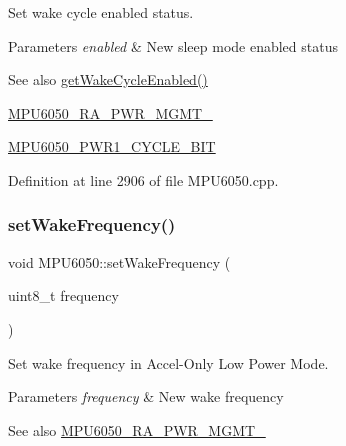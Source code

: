 Set wake cycle enabled status. 
\begin{DoxyParams}{Parameters}
{\em enabled} & New sleep mode enabled status \\
\hline
\end{DoxyParams}
\begin{DoxySeeAlso}{See also}
\mbox{\hyperlink{classMPU6050_a89afc5235b9088c696e2cc7841f5259a}{get\+Wake\+Cycle\+Enabled()}} 

\mbox{\hyperlink{MPU6050_8h_ac6c83146165a2307ac7155d4fa566df4}{M\+P\+U6050\+\_\+\+R\+A\+\_\+\+P\+W\+R\+\_\+\+M\+G\+M\+T\+\_}} 

\mbox{\hyperlink{MPU6050_8h_a78ae6e61ebfd0704101e073b268151d4}{M\+P\+U6050\+\_\+\+P\+W\+R1\+\_\+\+C\+Y\+C\+L\+E\+\_\+\+B\+IT}} 
\end{DoxySeeAlso}


Definition at line 2906 of file M\+P\+U6050.\+cpp.


\begin{DoxyCode}{0}

\end{DoxyCode}
\mbox{\label{classMPU6050_a62495e89f4787e6b18f0f795cef2b7cd}} 
\subsubsection{\texorpdfstring{setWakeFrequency()}{setWakeFrequency()}}
{\footnotesize\ttfamily void M\+P\+U6050\+::set\+Wake\+Frequency (\begin{DoxyParamCaption}\item[{uint8\+\_\+t}]{frequency }\end{DoxyParamCaption})}

Set wake frequency in Accel-\/\+Only Low Power Mode. 
\begin{DoxyParams}{Parameters}
{\em frequency} & New wake frequency \\
\hline
\end{DoxyParams}
\begin{DoxySeeAlso}{See also}
\mbox{\hyperlink{MPU6050_8h_aace6ce286da4d5f8c8f5ba6f80688e13}{M\+P\+U6050\+\_\+\+R\+A\+\_\+\+P\+W\+R\+\_\+\+M\+G\+M\+T\+\_}} 
\end{DoxySeeAlso}


